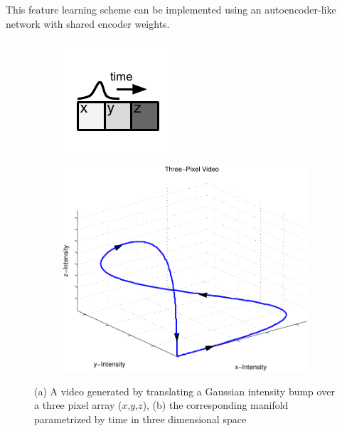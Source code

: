 This feature learning scheme can be implemented using an autoencoder-like network with shared encoder weights. 
\begin{figure}
  \centering
  \begin{subfigure}[b]{0.15\textwidth}
        \includegraphics[width=\textwidth]{./figures/linear/fig1.pdf}
        \caption{}
        \label{fig:3pixels}
  \end{subfigure}
  \begin{subfigure}[b]{0.45\textwidth}
        \includegraphics[width=\textwidth]{./figures/linear/fig2.pdf} 
        \caption{}
        \label{fig:manifold}
  \end{subfigure}
  \caption{(a) A video generated by translating a Gaussian intensity bump over a three pixel array ($x$,$y$,$z$), (b) the corresponding manifold parametrized by time in three dimensional space}
  \label{fig:threepixel}
\end{figure}

